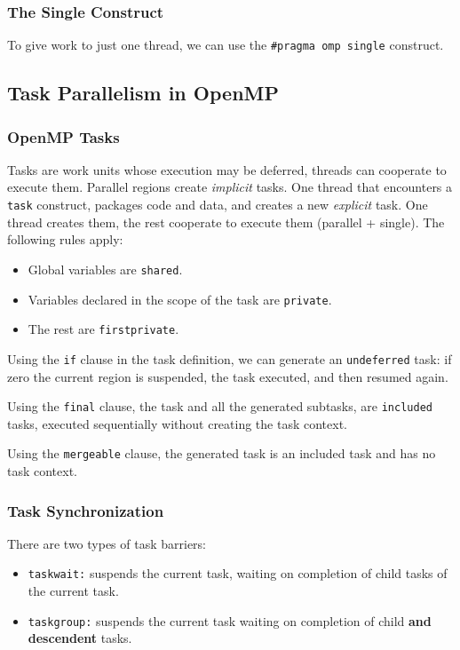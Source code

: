 \subsubsection{The Single Construct}

To give work to just one thread, we can use the \texttt{\#pragma omp single} construct.

\subsection{Task Parallelism in OpenMP}

\subsubsection{OpenMP Tasks}
Tasks are work units whose execution may be deferred, threads can cooperate to execute them.
Parallel regions create \textit{implicit} tasks.
One thread that encounters a \texttt{task} construct, packages code and data, and creates a new \textit{explicit} task.
One thread creates them, the rest cooperate to execute them (parallel + single).
The following rules apply:
\begin{itemize}
    \item Global variables are \texttt{shared}.
    \item Variables declared in the scope of the task are \texttt{private}.
    \item The rest are \texttt{firstprivate}.
\end{itemize}

Using the \texttt{if} clause in the task definition, we can generate an \texttt{undeferred} task: if zero the current region is suspended, the task executed, and then resumed again.

Using the \texttt{final} clause, the task and all the generated subtasks, are \texttt{included} tasks, executed sequentially without creating the task context.

Using the \texttt{mergeable} clause, the generated task is an included task and has no task context.

\subsubsection{Task Synchronization}

There are two types of task barriers:
\begin{itemize}
    \item \texttt{taskwait:} suspends the current task, waiting on completion of child tasks of the current task.
    \item \texttt{taskgroup:} suspends the current task waiting on completion of child \textbf{and descendent} tasks.
\end{itemize}
